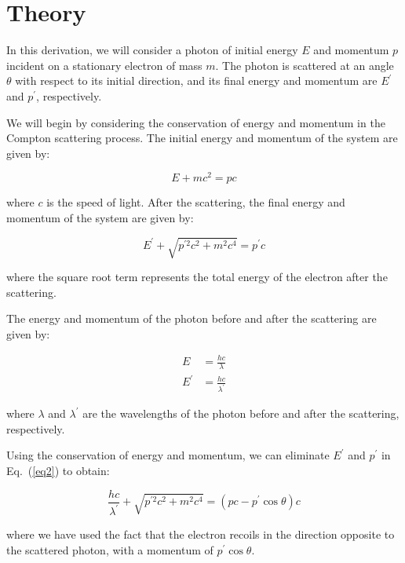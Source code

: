 \section{Theory}

In this derivation, we will consider a photon of initial energy $E$ and momentum $p$ incident on a stationary electron of mass $m$. The photon is scattered at an angle $\theta$ with respect to its initial direction, and its final energy and momentum are $E^\prime$ and $p^\prime$, respectively.

We will begin by considering the conservation of energy and momentum in the Compton scattering process. The initial energy and momentum of the system are given by:

\begin{equation}
E + mc^2 = pc \label{eq1}
\end{equation}

where $c$ is the speed of light. After the scattering, the final energy and momentum of the system are given by:

\begin{equation}
E^\prime + \sqrt{p^{\prime 2}c^2 + m^2c^4} = p^\prime c \label{eq2}
\end{equation}

where the square root term represents the total energy of the electron after the scattering.

The energy and momentum of the photon before and after the scattering are given by:

\begin{align}
E &= \frac{hc}{\lambda} \label{eq3}\\
E^\prime &= \frac{hc}{\lambda^\prime} \label{eq4}
\end{align}

where $\lambda$ and $\lambda^\prime$ are the wavelengths of the photon before and after the scattering, respectively.

Using the conservation of energy and momentum, we can eliminate $E^\prime$ and $p^\prime$ in Eq.~(\ref{eq2}) to obtain:

\begin{equation}
\frac{hc}{\lambda^\prime} + \sqrt{p^{\prime 2}c^2 + m^2c^4} = (pc - p^\prime\cos\theta)c \label{eq5}
\end{equation}

where we have used the fact that the electron recoils in the direction opposite to the scattered photon, with a momentum of $p^\prime\cos\theta$.

